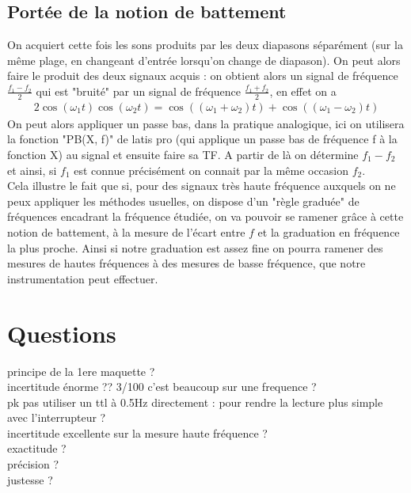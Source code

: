 \documentclass[12pt,prb,aps,epsf]{article}
\begin{document}
\subsection{Portée de la notion de battement}
On acquiert cette fois les sons produits par les deux diapasons séparément (sur la même plage, en changeant d'entrée lorsqu'on change de diapason). On peut alors faire le produit des deux signaux acquis : on obtient alors un signal de fréquence $\frac{f_1 - f_2}{2}$ qui est "bruité" par un signal de fréquence $\frac{f_1 + f_2}{2}$, en effet on a 
\begin{eqnarray}
2\cos(\omega_1 t) \cos (\omega_2 t) = \cos\left((\omega_1+\omega_2)t\right) +  \cos\left((\omega_1-\omega_2)t\right)
\end{eqnarray}
On peut alors appliquer un passe bas, dans la pratique analogique, ici on utilisera la fonction "PB(X, f)" de latis pro (qui applique un passe bas de fréquence f à la fonction X) au signal et ensuite faire sa TF. A partir de là on détermine $f_1-f_2$ et ainsi, si $f_1$ est connue précisément on connait par la même occasion $f_2$.\\ 

Cela illustre le fait que si, pour des signaux très haute fréquence auxquels on ne peux appliquer les méthodes usuelles, on dispose d'un "règle graduée" de fréquences encadrant la fréquence étudiée, on va pouvoir se ramener grâce à cette notion de battement, à la mesure de l'écart entre $f$ et la graduation en fréquence la plus proche. Ainsi si notre graduation est assez fine on pourra ramener des mesures de hautes fréquences à des mesures de basse fréquence, que notre instrumentation peut effectuer.

\section*{Questions}
principe de la 1ere maquette ?\\

incertitude énorme ?? 3/100 c'est beaucoup sur une frequence ?\\

pk pas utiliser un ttl à 0.5Hz directement : pour rendre la lecture plus simple avec l'interrupteur ?\\

incertitude excellente sur la mesure haute fréquence ?\\
exactitude ?\\
précision ?\\
justesse ?\\
\end{document}
